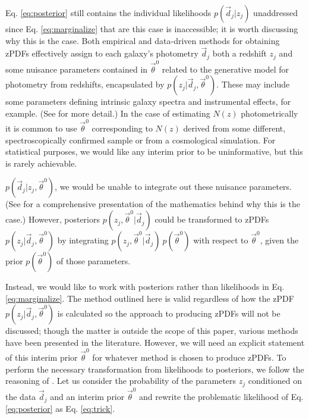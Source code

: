 \documentclass[preprint]{aastex}
\begin{document}
Eq. \ref{eq:posterior} still contains the individual likelihoods 
$p(\vec{d}_{j}|z_{j})$ unaddressed since Eq. \ref{eq:marginalize} that are this 
case is inaccessible; it is worth discussing why this is the case.  Both 
empirical and data-driven methods for obtaining zPDFs effectively assign to 
each galaxy's photometry $\vec{d}_{j}$ both a redshift $z_{j}$ and some 
nuisance parameters contained in $\vec{\theta}^{0}$ related to the generative 
model for photometry from redshifts, encapsulated by 
$p(z_{j}|\vec{d}_{j},\vec{\theta}^{0})$.  These may include some parameters 
defining intrinsic galaxy spectra and instrumental effects, for example. (See 
\citet{ben98} for more detail.)  In the case of estimating $N(z)$ 
photometrically it is common to use $\vec{\theta}^{0}$ corresponding to $N(z)$ 
derived from some different, spectroscopically confirmed sample or from a 
cosmological simulation.  For statistical purposes, we would like any interim 
prior to be uninformative, but this is rarely achievable.

$p(\vec{d}_{j}|z_{j},\vec{\theta}^{0})$, we would be unable to integrate out 
these nuisance parameters.  (See \citet{hog12} for a comprehensive presentation 
of the mathematics behind why this is the case.)  However, posteriors 
$p(z_{j},\vec{\theta}^{0}|\vec{d}_{j})$ could be transformed to zPDFs 
$p(z_{j}|\vec{d}_{j},\vec{\theta}^{0})$ by integrating 
$p(z_{j},\vec{\theta}^{0}|\vec{d}_{j})\ p(\vec{\theta}^{0})$ with respect to 
$\vec{\theta}^{0}$, given the prior  $p(\vec{\theta}^{0})$ of those parameters. 
 

Instead, we would like to work with posteriors rather than likelihoods in Eq. 
\ref{eq:marginalize}.  The method outlined here is valid regardless of how the 
zPDF $p(z_{j}|\vec{d}_{j},\vec{\theta}^{0})$ is calculated so the approach to 
producing zPDFs will not be discussed; though the matter is outside the scope 
of this paper, various methods have been presented in the literature. 
\citep{she11, bal08, car13, car14a}  However, we will need an explicit 
statement of this interim prior $\vec{\theta}^{0}$ for whatever method is 
chosen to produce zPDFs.  To perform the necessary transformation from 
likelihoods to posteriors, we follow the reasoning of \citet{mar15}.  Let us 
consider the probability of the parameters $z_{j}$ conditioned on the data 
$\vec{d}_{j}$ and an interim prior $\vec{\theta}^{0}$ and rewrite the 
problematic likelihood of Eq. \ref{eq:posterior} as Eq. \ref{eq:trick}.  
\end{document}
